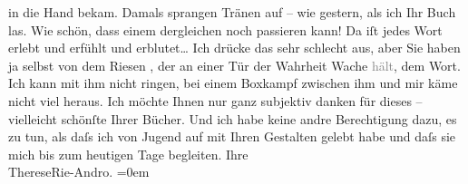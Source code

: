 \begin{ledgroupsized}[t]{13cm}
               in die Hand bekam. Damals sprangen Tränen auf – wie gestern, als ich Ihr Buch las. Wie schön, dass einem
               dergleichen noch passieren kann! Da iſt jedes Wort erlebt und erfühlt und erblutet{\dots} Ich drücke das sehr schlecht aus, aber Sie haben ja
               selbst von dem Riesen \label{K_L02568-1v}\label{K_L02568-1h}, der an einer Tür der Wahrheit Wache
                  \textcolor{gray}{hält}, dem Wort. Ich kann mit ihm nicht ringen, bei einem
               Boxkampf zwischen ihm und mir käme nicht viel heraus. Ich möchte Ihnen nur ganz
               subjektiv danken für dieses – vielleicht schönſte Ihrer Bücher. Und ich habe keine
               andre Berechtigung dazu, es zu tun, als daſs ich von Jugend auf mit Ihren Gestalten
               gelebt habe und daſs sie mich bis zum heutigen Tage begleiten.\pend
           \pstart
           Ihre{\\[\baselineskip]}\spacefill\mbox{ThereseRie-Andro.}\pend
           \leftskip=0em{}
         
         \endnumbering{}\end{ledgroupsized}  \newcommand{\dateiname}{L02568}\newcommand{\titel}{Therese Rie-Andro an Arthur Schnitzler, 25. 12. 1927}\newcommand{\editorInnen}{Martin Anton Müller und Gerd-Hermann Susen}
      